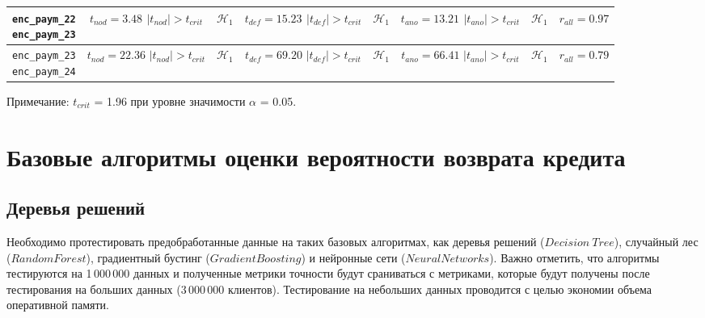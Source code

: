 \begin{table}[H]
{\begin{tabular}{|c|c|c|c|c|c|c|c|}
		\specialcell{\texttt{enc\_paym\_{22}}\\\texttt{enc\_paym\_{23}}} &
		\specialcell{$t_{nod} = 3.48$\\$|t_{nod}| > t_{crit}$} & $\mathcal{H}_1$ &
		\specialcell{$t_{def} = 15.23$\\$|t_{def}| > t_{crit}$} & $\mathcal{H}_1$ &
		\specialcell{$t_{ano} = 13.21$\\$|t_{ano}| > t_{crit}$} & $\mathcal{H}_1$ &
		$r_{all} = 0.97$ \\ \hline
	
		\specialcell{\texttt{enc\_paym\_{23}}\\\texttt{enc\_paym\_{24}}} &
		\specialcell{$t_{nod} = 22.36$\\$|t_{nod}| > t_{crit}$} & $\mathcal{H}_1$ &
		\specialcell{$t_{def} = 69.20$\\$|t_{def}| > t_{crit}$} & $\mathcal{H}_1$ &
		\specialcell{$t_{ano} = 66.41$\\$|t_{ano}| > t_{crit}$} & $\mathcal{H}_1$ &
		$r_{all} = 0.79$ \\ \hline
	\end{tabular} 
}

\end{table}

\begin{minipage}{0.98\textwidth}
	\fontsize{9}{11}\selectfont
	\justifying
	Примечание: $t_{crit}$ = 1.96 при уровне значимости $\alpha$ = 0.05.
\end{minipage}


\section{Базовые алгоритмы оценки вероятности возврата кредита}
\subsection{Деревья решений}
Необходимо протестировать предобработанные данные на таких базовых алгоритмах, как деревья решений ($Decision\ Tree$), случайный лес ($Random Forest$), градиентный бустинг ($Gradient Boosting$) и нейронные сети ($Neural Networks$). Важно отметить, что алгоритмы тестируются на 1\,000\,000 данных и полученные метрики точности будут сраниваться с метриками, которые будут получены после тестирования на больших данных (3\,000\,000 клиентов). Тестирование на небольших данных проводится с целью экономии объема оперативной памяти. 

